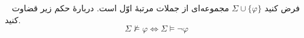 ~
فرض کنید $\Sigma \cup \{\varphi\}$ مجموعه‌ای از جملات مرتبهٔ اوّل است. دربارهٔ حکم زیر قضاوت کنید.
\[ \Sigma \not \vDash \varphi \iff \Sigma \vDash \neg \varphi \]